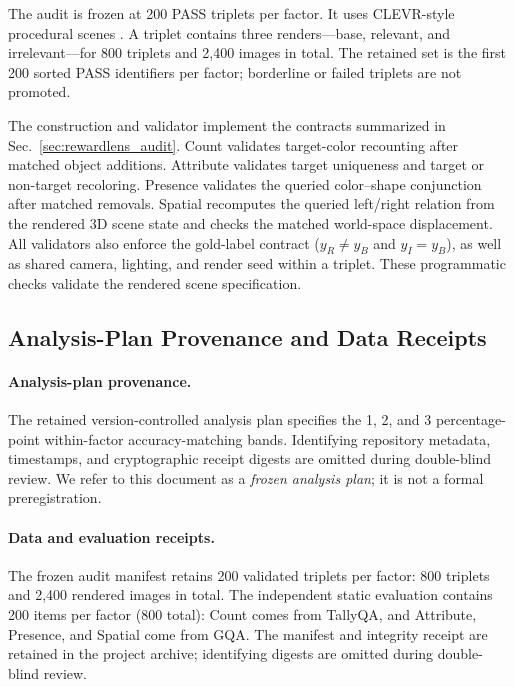 The audit is frozen at 200 PASS triplets per factor. It uses CLEVR-style
procedural scenes \citep{johnson2017clevr}. A triplet contains three
renders---base, relevant, and irrelevant---for 800 triplets and 2,400 images in
total. The retained set is the first 200 sorted PASS identifiers per factor;
borderline or failed triplets are not promoted.

The construction and validator implement the contracts summarized in
Sec.~\ref{sec:rewardlens_audit}. Count validates target-color recounting after
matched object additions. Attribute validates target uniqueness and target or
non-target recoloring. Presence validates the queried color--shape conjunction
after matched removals. Spatial recomputes the queried left/right relation from
the rendered 3D scene state and checks the matched world-space displacement.
All validators also enforce the gold-label contract ($y_R\neq y_B$ and
$y_I=y_B$), as well as shared camera, lighting, and render seed within a
triplet. These programmatic checks validate the rendered scene specification.

\subsection{Analysis-Plan Provenance and Data Receipts}
\label{app:provenance-receipts}

\paragraph{Analysis-plan provenance.}
The retained version-controlled analysis plan specifies the 1, 2, and 3
percentage-point within-factor accuracy-matching bands. Identifying repository
metadata, timestamps, and cryptographic receipt digests are omitted during
double-blind review. We refer to this document as a \emph{frozen analysis
plan}; it is not a formal preregistration.

\paragraph{Data and evaluation receipts.}
The frozen audit manifest retains 200 validated triplets per factor: 800
triplets and 2,400 rendered images in total. The independent static evaluation
contains 200 items per factor (800 total): Count comes from TallyQA, and
Attribute, Presence, and Spatial come from GQA. The manifest and integrity
receipt are retained in the project archive; identifying digests are omitted
during double-blind review.

